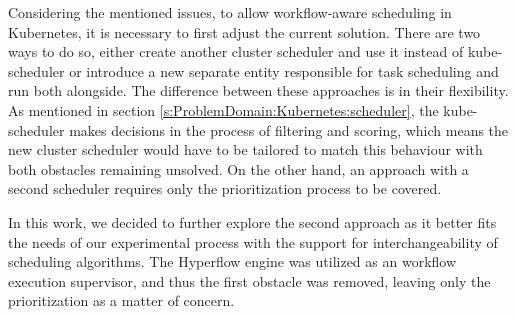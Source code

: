 


Considering the mentioned issues, to allow workflow-aware scheduling in Kubernetes, it is necessary to first adjust the current solution.
There are two ways to do so, either create another cluster scheduler and use it instead of kube-scheduler or introduce a new separate entity responsible for task scheduling and run both alongside.
The difference between these approaches is in their flexibility.
As mentioned in section \ref{s:ProblemDomain:Kubernetes:scheduler}, the kube-scheduler makes decisions in the process of filtering and scoring, which means the new cluster scheduler would have to be tailored to match this behaviour with both obstacles remaining unsolved.
On the other hand, an approach with a second scheduler requires only the prioritization process to be covered.

In this work, we decided to further explore the second approach as it better fits the needs of our experimental process with the support for interchangeability of scheduling algorithms. The Hyperflow engine was utilized as an workflow execution supervisor, and thus the first obstacle was removed, leaving only the prioritization as a matter of concern.















